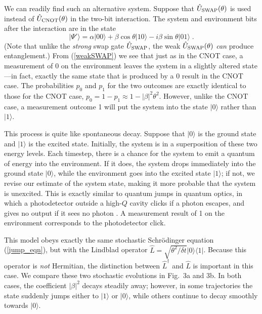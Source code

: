 \documentclass[12pt]{article}
\def\bra#1{{\langle #1 |}}
\def\ket#1{{| #1 \rangle}}
\def\U{{\hat U}}
\def\L{{\hat L}}
\def\Ldag{{\hat L^\dagger}}
\begin{document}
We can readily find such an alternative system.
Suppose that $\U_{\rm SWAP}(\theta)$
is used instead of
$\U_{\rm CNOT}(\theta)$
in the two-bit interaction.  The system and environment bits
after the interaction are in the state
\begin{equation}
\ket{\Psi'} = \alpha\ket{00} + \beta\cos\theta\ket{10}
  - i \beta\sin\theta\ket{01} \;.
\label{weakSWAP}
\end{equation}
(Note that unlike the {\it strong} swap gate $\U_{\rm SWAP}$, the weak
$\U_{\rm SWAP}(\theta)$ {\it can} produce entanglement.)
From (\ref{weakSWAP}) we see that just as in the CNOT case,
a measurement of 0 on the environment leaves the system in a slightly
altered state---in fact, exactly the same state that is produced by a 0
result in the CNOT case.  The probabilities $p_0$ and $p_1$ for the two
outcomes are exactly identical to those for the CNOT case,
$p_0 = 1 - p_1 \approx 1 - |\beta|^2\theta^2$.  However, unlike
the CNOT case, a measurement outcome 1 will put the system
into the state $\ket0$ rather than $\ket1$.

This process is quite like spontaneous decay.  Suppose that $\ket0$
is the ground state and $\ket1$ is the excited state.  Initially, the
system is in a superposition of these two energy levels.  Each timestep,
there is a chance for the system to emit a quantum of energy into the
environment.  If it does, the system drops immediately into
the ground state $\ket0$, while the environment goes into the
excited state $\ket1$; if not, we revise our estimate of the system state,
making it more probable that the system is unexcited.  This is exactly
similar to quantum jumps in quantum optics, in which
a photodetector outside a high-$Q$ cavity clicks if a photon escapes,
and gives no output if it sees no photon \cite{Carmichael,Dum,Gardiner}.
A measurement result of 1 on the environment corresponds to the
photodetector click.

This model obeys exactly the same stochastic Schr\"odinger equation
(\ref{jump_eqn}), but with the Lindblad operator
$\L = \sqrt{\theta^2/\delta t}\ket0\bra1$.  Because this operator
is {\it not} Hermitian, the distinction between $\Ldag$ and $\L$ is important
in this case.
We compare these two stochastic evolutions in Fig.~3a and 3b.  In both
cases, the coefficient $|\beta|^2$ decays steadily away; however, in
some trajectories the state suddenly jumps either to $\ket1$ or $\ket0$,
while others continue to decay smoothly towards $\ket0$.
\end{document}
